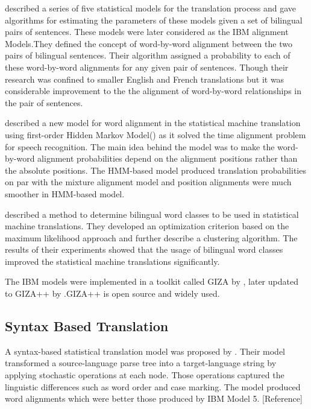 \cite{Brown:1993:MSM:972470.972474} described a series of five statistical models for the translation process and gave algorithms for estimating the parameters of these models given a set of bilingual pairs of sentences. These models were later considered as the IBM alignment Models.They defined the concept of word-by-word alignment between the two pairs of bilingual sentences. Their algorithm assigned a probability to each of these word-by-word alignments for any given pair of sentences. Though their research was confined to smaller English and French translations but it was considerable improvement to the the alignment of word-by-word relationships in the pair of sentences.

\cite{Vogel:1996:HWA:993268.993313} described a new model for word alignment in the statistical machine translation using first-order Hidden Markov Model(\cite{Jelinek76continuousspeech}) as it solved the time alignment problem for speech recognition. The main idea behind the model was to make the word-by-word alignment probabilities depend on the alignment positions rather than the absolute positions. The HMM-based model produced translation probabilities on par with the mixture alignment model and position alignments were much smoother in HMM-based model.

\cite{Och:1999:EMD:977035.977046} described a method to determine bilingual word classes to be used in statistical machine translations. They developed an optimization criterion based on the maximum likelihood approach and further describe a clustering algorithm. The results of their experiments showed that the usage of bilingual word classes improved the statistical machine translations significantly.

The IBM models were implemented in a toolkit called GIZA by \cite{Giza}, later updated to GIZA++ by \cite{Och:2000}.GIZA++ is open source and widely used.

\subsection{Syntax Based Translation}
A syntax-based statistical translation model was proposed by \cite{Yamada:2001:SST:1073012.1073079}. Their model transformed a source-language parse tree into a target-language string by applying stochastic operations at each node. Those operations captured the linguistic differences such as word order and case marking. The model produced word alignments which were better those produced by IBM Model 5. [Reference]


